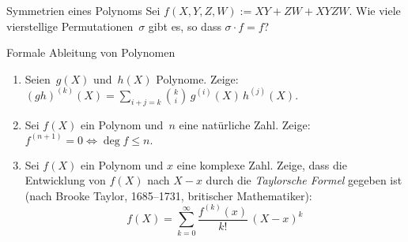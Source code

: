 \documentclass{algblatt}
\begin{document}
\begin{aufgabe}{Symmetrien eines Polynoms}
Sei $f(X, Y, Z, W) := X Y + Z W + X Y Z W$.
Wie viele vierstellige Permutationen~$\sigma$ gibt es, so dass
$\sigma \cdot f = f$?
\end{aufgabe}

\begin{aufgabe}{Formale Ableitung von Polynomen}
\begin{enumerate}
\item Seien~$g(X)$ und~$h(X)$ Polynome. Zeige:
$
  (g h)^{(k)}(X)
  = \sum_{i + j = k} \binom k i \, g^{(i)}(X) \, h^{(j)}(X).
$

\item Sei $f(X)$ ein Polynom und~$n$ eine natürliche Zahl. Zeige:
$f^{(n + 1)} = 0 \Longleftrightarrow \deg f \leq n.$

\item Sei $f(X)$ ein Polynom und $x$ eine komplexe Zahl. Zeige, dass die
Entwicklung von $f(X)$ nach $X - x$ durch die \emph{Taylorsche Formel} gegeben
ist (nach Brooke Taylor, 1685--1731, britischer Mathematiker):
\[
    f(X) = \sum_{k = 0}^\infty \frac{f^{(k)}(x)}{k!} \, (X - x)^k
\]
\end{enumerate}
\end{aufgabe}
\end{document}

